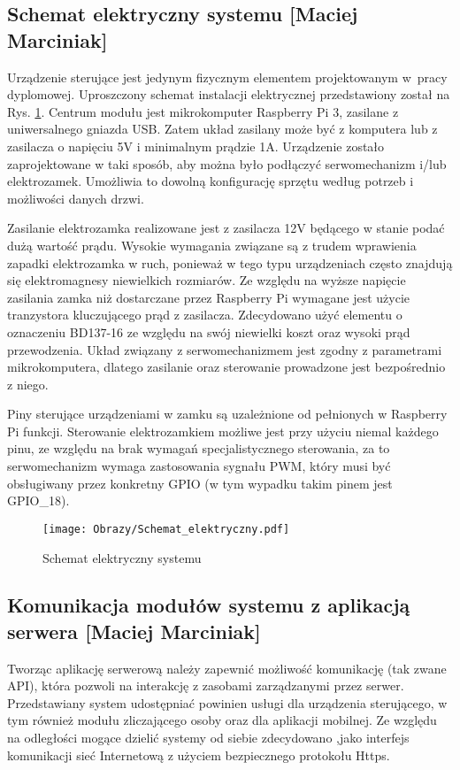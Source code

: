 \subsection{Schemat elektryczny systemu [Maciej Marciniak]}\label{sec:Schemat elektryczny zamka}
Urządzenie sterujące jest jedynym fizycznym elementem projektowanym w~pracy dyplomowej. Uproszczony schemat instalacji elektrycznej przedstawiony został na Rys. \ref{schemat:schemat elektryczny systemu}. Centrum modułu jest mikrokomputer Raspberry Pi 3, zasilane z uniwersalnego gniazda USB. Zatem układ zasilany może być z komputera lub z zasilacza o napięciu 5V i minimalnym prądzie 1A. Urządzenie zostało zaprojektowane w taki sposób, aby można było podłączyć serwomechanizm i/lub elektrozamek. Umożliwia to dowolną konfigurację sprzętu według potrzeb i możliwości danych drzwi. 

Zasilanie elektrozamka realizowane jest z zasilacza 12V będącego w stanie podać dużą wartość prądu. Wysokie wymagania związane są z trudem wprawienia zapadki elektrozamka w ruch, ponieważ w tego typu urządzeniach często znajdują się elektromagnesy niewielkich rozmiarów. Ze względu na wyższe napięcie zasilania zamka niż dostarczane przez Raspberry Pi wymagane jest użycie tranzystora kluczującego prąd z zasilacza. Zdecydowano użyć elementu o oznaczeniu BD137-16 ze względu na swój niewielki koszt oraz wysoki prąd przewodzenia. Układ związany z serwomechanizmem jest zgodny z parametrami mikrokomputera, dlatego zasilanie oraz sterowanie prowadzone jest bezpośrednio z niego.

Piny sterujące urządzeniami w zamku są uzależnione od pełnionych w Raspberry Pi funkcji. Sterowanie elektrozamkiem możliwe jest przy użyciu niemal każdego pinu, ze względu na brak wymagań specjalistycznego sterowania, za to serwomechanizm wymaga zastosowania sygnału PWM, który musi być obsługiwany przez konkretny GPIO (w tym wypadku takim pinem jest GPIO\_18).\cite{RP3}
\newpage
\begin{figure}[!h]
	\centering
	\texttt{[image: Obrazy/Schemat\_elektryczny.pdf]}
	\caption{Schemat elektryczny systemu}
	\label{schemat:schemat elektryczny systemu}
\end{figure}
\newpage

\subsection{Komunikacja modułów systemu z aplikacją  serwera [Maciej Marciniak]}\label{Komunikacja serwer}
Tworząc aplikację serwerową należy zapewnić możliwość komunikację (tak zwane API), która pozwoli na interakcję z zasobami zarządzanymi przez serwer. Przedstawiany system udostępniać powinien usługi dla urządzenia sterującego, w tym również modułu zliczającego osoby oraz dla aplikacji mobilnej. Ze względu na odległości mogące dzielić systemy od siebie zdecydowano ,jako interfejs komunikacji sieć Internetową z użyciem bezpiecznego protokołu Https. 
